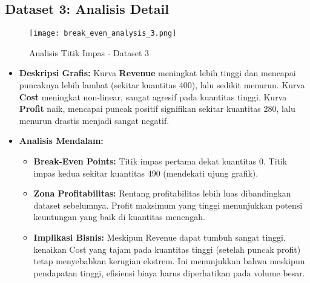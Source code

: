 \documentclass[conference]{IEEEtran}
\begin{document}
\subsection*{Dataset 3: Analisis Detail}
\begin{figure}[H]
    \centering
    \texttt{[image: break\_even\_analysis\_3.png]}
    \caption{Analisis Titik Impas - Dataset 3}
    \label{fig:dataset3_new}
\end{figure}
\begin{itemize}
    \item \textbf{Deskripsi Grafis:} Kurva \textbf{Revenue} meningkat lebih tinggi dan mencapai puncaknya lebih lambat (sekitar kuantitas 400), lalu sedikit menurun. Kurva \textbf{Cost} meningkat non-linear, sangat agresif pada kuantitas tinggi. Kurva \textbf{Profit} naik, mencapai puncak positif signifikan sekitar kuantitas 280, lalu menurun drastis menjadi sangat negatif.
    \item \textbf{Analisis Mendalam:}
    \begin{itemize}
        \item \textbf{Break-Even Points:} Titik impas pertama dekat kuantitas 0. Titik impas kedua sekitar kuantitas 490 (mendekati ujung grafik).
        \item \textbf{Zona Profitabilitas:} Rentang profitabilitas lebih luas dibandingkan dataset sebelumnya. Profit maksimum yang tinggi menunjukkan potensi keuntungan yang baik di kuantitas menengah.
        \item \textbf{Implikasi Bisnis:} Meskipun Revenue dapat tumbuh sangat tinggi, kenaikan Cost yang tajam pada kuantitas tinggi (setelah puncak profit) tetap menyebabkan kerugian ekstrem. Ini menunjukkan bahwa meskipun pendapatan tinggi, efisiensi biaya harus diperhatikan pada volume besar.
    \end{itemize}
\end{itemize}
\end{document}
